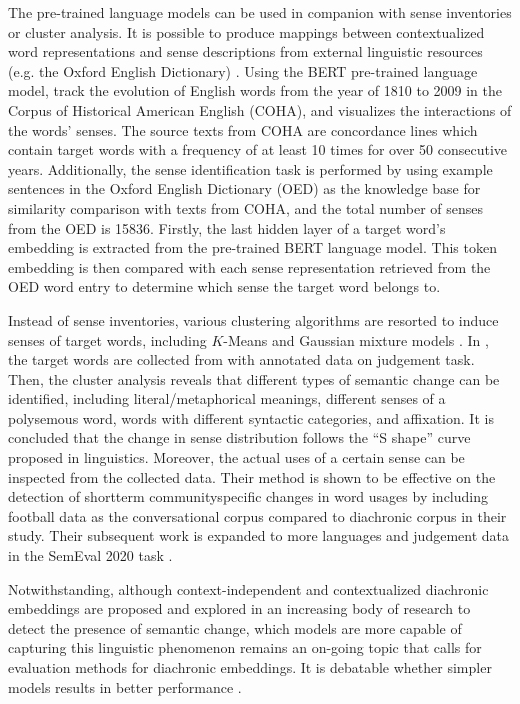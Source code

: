 The pre-trained language models can be used in companion with sense inventories or cluster analysis. It is possible to produce mappings between contextualized word representations and sense descriptions from external linguistic resources (e.g. the Oxford English Dictionary) \parencite{hu2019diachronic}. Using the BERT pre-trained language model, \textcite{hu2019diachronic} track the evolution of English words from the year of 1810 to 2009 in the Corpus of Historical American English (COHA), and visualizes the interactions of the words' senses. The source texts from COHA are concordance lines which contain target words with a frequency of at least 10 times for over 50 consecutive years. Additionally, the sense identification task is performed by using example sentences in the Oxford English Dictionary (OED) as the knowledge base for similarity comparison with texts from COHA, and the total number of senses from the OED is 15836. Firstly, the last hidden layer of a target word's embedding is extracted from the pre-trained BERT language model. This token embedding is then compared with each sense representation retrieved from the OED word entry to determine which sense the target word belongs to.

Instead of sense inventories, various clustering algorithms are resorted to induce senses of target words, including $K$-Means and Gaussian mixture models \parencite{giulianelli2019lexical}. In \textcite{giulianelli2019lexical}, the target words are collected from \textcite{gulordava2011distributional} with annotated data on judgement task. Then, the cluster analysis reveals that different types of semantic change can be identified, including literal/metaphorical meanings, different senses of a polysemous word, words with different syntactic categories, and affixation. It is concluded that the change in sense distribution follows the ``S shape'' curve proposed in linguistics. Moreover, the actual uses of a certain sense can be inspected from the collected data. Their method is shown to be effective on the detection of short\text{-}term community\text{-}specific changes in word usages by including football data as the conversational corpus compared to diachronic corpus in their study. Their subsequent work is expanded to more languages and judgement data in the SemEval 2020 task \parencite{kutuzov2020uio}.

Notwithstanding, although context-independent and contextualized diachronic embeddings are proposed and explored in an increasing body of research to detect the presence of semantic change, which models are more capable of capturing this linguistic phenomenon remains an on-going topic that calls for evaluation methods for diachronic embeddings. It is debatable whether simpler models results in better performance \parencite{schlechtweg2019wind}.

